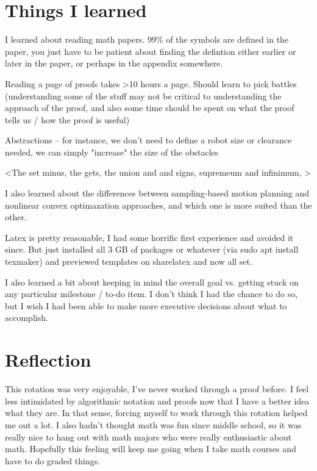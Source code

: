 \documentclass[a4paper]{article}
\begin{document}

\section{Things I learned}

I learned about reading math papers. 99\% of the symbols are defined in the
paper, you just have to be patient about finding the defintion either earlier or later in
the paper, or perhaps in the appendix somewhere. 

    Reading a page of proofs takes >10 hours a page. Should learn to pick
    battles (understanding some of the stuff may not be critical to
    understanding the approach of the proof, and also some time should be spent
    on what the proof tells us / how the proof is useful)

    Abstractions -- for instance, we don't need to define a robot size or
    clearance needed, we can
    simply "increase" the size of the obstacles

<The set minus, the gets, the union and and signs, supremeum and infinimum, >


I also learned about the differences between sampling-based motion planning and
nonlinear convex optimazation approaches, and which one is more suited than the
other.

Latex is pretty reasonable, I had some horrific first experience and avoided it
    since. But just installed all 3 GB of packages or whatever (via sudo apt
    install texmaker) and previewed templates on sharelatex and now all set.

I also learned a bit about keeping in mind the overall goal vs. getting stuck on
any particular milestone / to-do item. I don't think I had the chance to do so,
but I wish I had been able to make more executive decisions about what to
accomplish. 

\section{Reflection}

This rotation was very enjoyable, I've never worked through a proof before. I
feel less intimidated by algorithmic notation and proofs now that I have a
better idea what they are. In that sense, forcing myself to work through this
rotation helped me out a lot. I also hadn't thought math was fun since middle
school, so it was really nice to hang out with math majors who were really
enthusiastic about math. Hopefully this feeling will keep me going when I take
math courses and have to do graded things.
\end{document}
